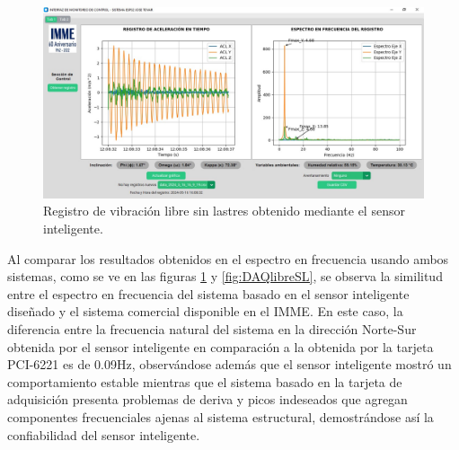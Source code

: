 \begin{figure}[H]
    \centering
    \includegraphics[width = \textwidth]{imagenes/cap3_resultados/Ensayos/VibLibreSinLastresSMARTSENSOR.jpg}
    \caption{Registro de vibración libre sin lastres obtenido mediante el sensor inteligente.}
    \label{fig:libreGUI_SL}
\end{figure}

Al comparar los resultados obtenidos en el espectro en frecuencia usando ambos sistemas, como se ve en las figuras \ref{fig:libreGUI_SL} y \ref{fig:DAQlibreSL}, se observa la similitud entre el espectro en frecuencia del sistema basado en el sensor inteligente diseñado y el sistema comercial disponible en el IMME. En este caso, la diferencia entre la frecuencia natural del sistema en la dirección Norte-Sur obtenida por el sensor inteligente en comparación a la obtenida por la tarjeta PCI-6221 es de 0.09Hz, observándose además que el sensor inteligente mostró un comportamiento estable mientras que el sistema basado en la tarjeta de adquisición presenta problemas de deriva y picos indeseados que agregan componentes frecuenciales ajenas al sistema estructural, demostrándose así la confiabilidad del sensor inteligente.


